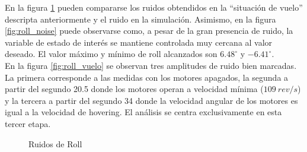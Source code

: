 \documentclass[main]{subfiles}
\begin{document}
En la figura \ref{fig:ruidos_roll} pueden compararse los ruidos obtendidos en la ``situaci\'on de vuelo'' descripta anteriormente y el ruido en la simulaci\'on. Asimismo, en la figura \ref{fig:roll_noise} puede observarse como, a pesar de la gran presencia de ruido, la variable de estado de inter\'es se mantiene controlada muy cercana al valor deseado. El valor m\'aximo y m\'inimo de roll alcanzados son $6.48^\circ$ y $-6.41^\circ$.\\

En la figura \ref{fig:roll_vuelo} se observan tres amplitudes de ruido bien marcadas. La primera corresponde a las medidas con los motores apagados, la segunda a partir del segundo 20.5 donde los motores operan a velocidad m\'inima ($109 \: rev/s$) y la tercera a partir del segundo 34 donde la velocidad angular de los motores es igual a la velocidad de hovering. El an\'alisis se centra exclusivamente en esta tercer etapa.\\

\begin{figure}[h!]
  \centering
  \caption{Ruidos de Roll}
  \label{fig:ruidos_roll}
\end{figure}
  
\end{document}
